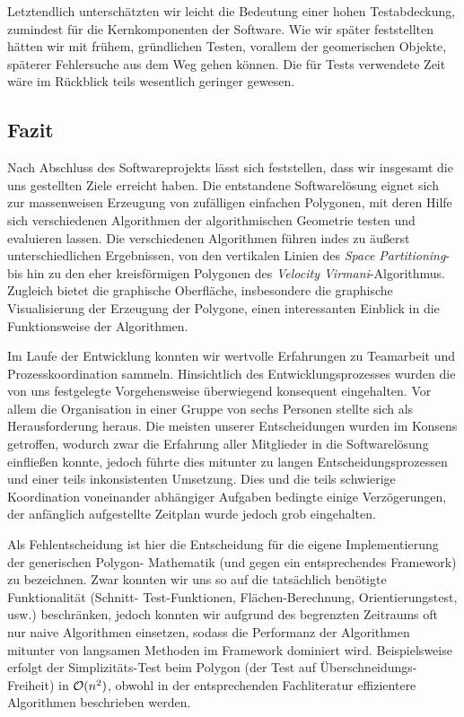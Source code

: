     Letztendlich unterschätzten wir leicht die Bedeutung einer hohen
    Testabdeckung, zumindest für die Kernkomponenten der Software. Wie wir
    später feststellten hätten wir mit frühem, gründlichen Testen, vorallem der
    geomerischen Objekte, späterer Fehlersuche aus dem Weg gehen können. Die für
    Tests verwendete Zeit wäre im Rückblick teils wesentlich geringer gewesen.

  \subsection{Fazit}

    Nach Abschluss des Softwareprojekts lässt sich feststellen, dass wir
    insgesamt die uns gestellten Ziele erreicht haben. Die entstandene
    Softwarelösung eignet sich zur massenweisen Erzeugung von zufälligen
    einfachen Polygonen, mit deren Hilfe sich verschiedenen Algorithmen der
    algorithmischen Geometrie testen und evaluieren lassen. Die verschiedenen
    Algorithmen führen indes zu äußerst unterschiedlichen Ergebnissen, von den
    vertikalen Linien des \emph{Space Partitioning}- bis hin zu den eher
    kreisförmigen Polygonen des \emph{Velocity Virmani}-Algorithmus. Zugleich
    bietet die graphische Oberfläche, insbesondere die graphische Visualisierung
    der Erzeugung der Polygone, einen interessanten Einblick in die
    Funktionsweise der Algorithmen.

    Im Laufe der Entwicklung konnten wir wertvolle Erfahrungen zu Teamarbeit und
    Prozesskoordination sammeln. Hinsichtlich des Entwicklungsprozesses wurden
    die von uns festgelegte Vorgehensweise überwiegend konsequent eingehalten.
    Vor allem die Organisation in einer Gruppe von sechs Personen stellte sich
    als Herausforderung heraus. Die meisten unserer Entscheidungen wurden im
    Konsens getroffen, wodurch zwar die Erfahrung aller Mitglieder in die
    Softwarelösung einfließen konnte, jedoch führte dies mitunter zu langen
    Entscheidungsprozessen und einer teils inkonsistenten Umsetzung. Dies und
    die teils schwierige Koordination voneinander abhängiger Aufgaben bedingte
    einige Verzögerungen, der anfänglich aufgestellte Zeitplan wurde jedoch grob
    eingehalten.

    Als Fehlentscheidung ist hier die Entscheidung für die eigene
    Implementierung der generischen Polygon- Mathematik (und gegen ein
    entsprechendes Framework) zu bezeichnen. Zwar konnten wir uns so auf die
    tatsächlich benötigte Funktionalität (Schnitt- Test-Funktionen,
    Flächen-Berechnung, Orientierungstest, usw.) beschränken, jedoch konnten wir
    aufgrund des begrenzten Zeitraums oft nur naive Algorithmen einsetzen,
    sodass die Performanz der Algorithmen mitunter von langsamen Methoden im
    Framework dominiert wird. Beispielsweise erfolgt der Simplizitäts-Test beim
    Polygon (der Test auf Überschneidungs-Freiheit) in $\mathcal{O}(n^2)$, obwohl in
    der entsprechenden Fachliteratur effizientere Algorithmen beschrieben
    werden.

